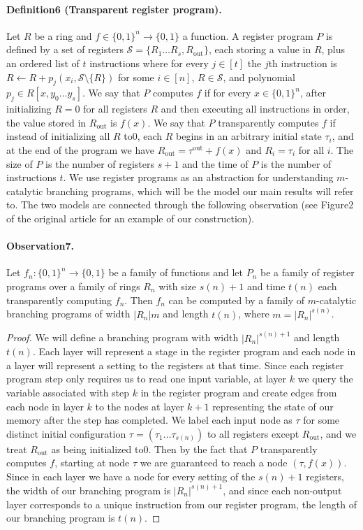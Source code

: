 \documentclass[10pt,a4paper]{article}
\begin{document}
\paragraph{Definition6 (Transparent register program).} Let $R$ be a ring and $f\in\{0,1\}^n\to\{0,1\}$ a function. A register program $P$ is defined by a set of registers $\mathcal S=\{R_1\ldots R_s,R_{\mathrm{out}}\}$, each storing a value in $R$, plus an ordered list of $t$ instructions where for every $j\in[t]$ the $j$th instruction is $R\leftarrow R+p_j(x_i,\mathcal S\setminus\{R\})$ for some $i\in[n]$, $R\in\mathcal S$, and polynomial $p_j\in R[x,y_0\ldots y_s]$.
We say that $P$ computes $f$ if for every $x\in\{0,1\}^n$, after initializing $R=0$ for all registers $R$ and then executing all instructions in order, the value stored in $R_{\mathrm{out}}$ is $f(x)$. We say that $P$ transparently computes $f$ if instead of initializing all $R$ to0, each $R$ begins in an arbitrary initial state $\tau_i$, and at the end of the program we have $R_{\mathrm{out}}=\tau^{\mathrm{out}}+f(x)$ and $R_i=\tau_i$ for all $i$. The size of $P$ is the number of registers $s+1$ and the time of $P$ is the number of instructions $t$.
We use register programs as an abstraction for understanding $m$-catalytic branching programs, which will be the model our main results will refer to. The two models are connected through the following observation (see Figure2 of the original article for an example of our construction).
\paragraph{Observation7.} Let $f_n:\{0,1\}^n\to\{0,1\}$ be a family of functions and let $P_n$ be a family of register programs over a family of rings $R_n$ with size $s(n)+1$ and time $t(n)$ each transparently computing $f_n$. Then $f_n$ can be computed by a family of $m$-catalytic branching programs of width $|R_n|m$ and length $t(n)$, where $m=|R_n|^{s(n)}$.
\begin{proof}
We will define a branching program with width $|R_n|^{s(n)+1}$ and length $t(n)$. Each layer will represent a stage in the register program and each node in a layer will represent a setting to the registers at that time. Since each register program step only requires us to read one input variable, at layer $k$ we query the variable associated with step $k$ in the register program and create edges from each node in layer $k$ to the nodes at layer $k+1$ representing the state of our memory after the step has completed. We label each input node as $\tau$ for some distinct initial configuration $\tau=(\tau_1\ldots\tau_{s(n)})$ to all registers except $R_{\mathrm{out}}$, and we treat $R_{\mathrm{out}}$ as being initialized to0. Then by the fact that $P$ transparently computes $f$, starting at node $\tau$ we are guaranteed to reach a node $(\tau,f(x))$. Since in each layer we have a node for every setting of the $s(n)+1$ registers, the width of our branching program is $|R_n|^{s(n)+1}$, and since each non-output layer corresponds to a unique instruction from our register program, the length of our branching program is $t(n)$.
\end{proof}
\end{document}
